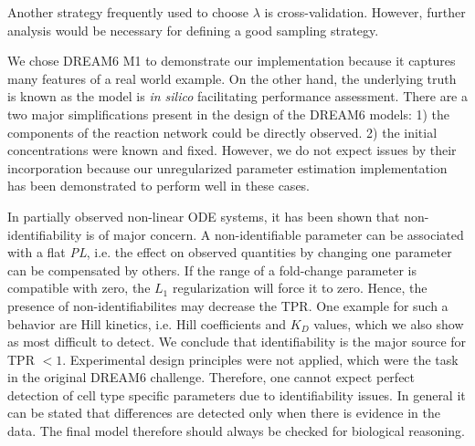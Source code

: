 \documentclass{bioinfo}
\begin{document}

Another strategy frequently used to choose $\lambda$ is cross-validation.
However, further analysis would be necessary for defining a good sampling strategy.


We chose DREAM6 M1 to demonstrate our implementation because it captures many features of a real world example.
On the other hand, the underlying truth is known as the model is \emph{in silico} facilitating performance assessment.
There are a two major simplifications present in the design of the DREAM6 models:
1) the components of the reaction network could be directly observed.
2) the initial concentrations were known and fixed.
However, we do not expect issues by their incorporation because our unregularized parameter estimation implementation has been demonstrated to perform well in these cases.

In partially observed non-linear ODE systems, it has been shown that non-identifiability is of major concern.
A non-identifiable parameter can be associated with a flat \emph{PL}, i.e. the effect on observed quantities by changing one parameter can be compensated by others.
If the range of a fold-change parameter is compatible with zero, the $L_1$ regularization will force it to zero.
Hence, the presence of non-identifiabilites may decrease the TPR.
One example for such a behavior are Hill kinetics, i.e. Hill coefficients and $K_D$ values, which we also show as most difficult to detect.
We conclude that identifiability is the major source for TPR $<1$.
Experimental design principles were not applied, which were the task in the original DREAM6 challenge.
Therefore, one cannot expect perfect detection of cell type specific parameters due to identifiability issues.
In general it can be stated that differences are detected only when there is evidence in the data.
The final model therefore should always be checked for biological reasoning.

%
%
%
%
\end{document}
